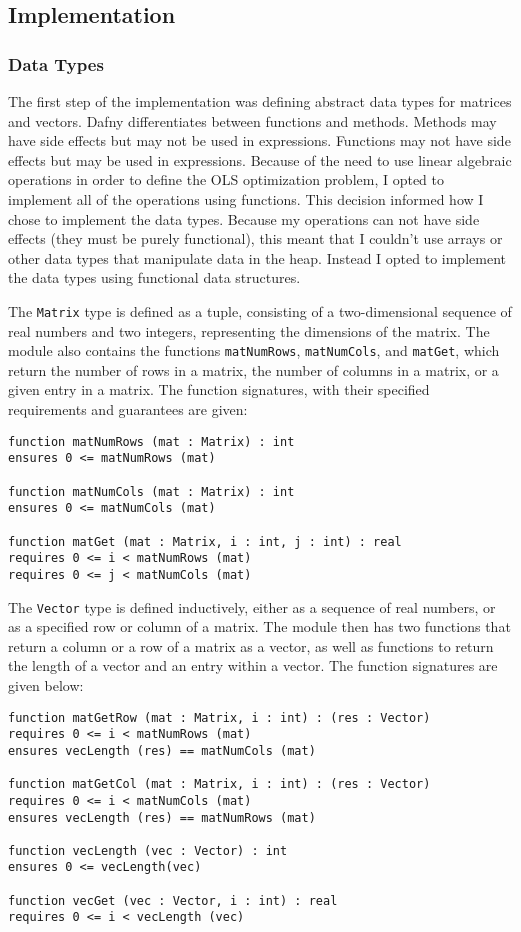 \documentclass[12pt]{article}
\begin{document}
\subsection{Implementation}
\subsubsection{Data Types}
The first step of the implementation was defining abstract data types for matrices and vectors. Dafny differentiates between functions and methods. Methods may have side effects but may not be used in expressions. Functions may not have side effects but may be used in expressions. Because of the need to use linear algebraic operations in order to define the OLS optimization problem, I opted to implement all of the operations using functions. This decision informed how I chose to implement the data types. Because my operations can not have side effects (they must be purely functional), this meant that I couldn't use arrays or other data types that manipulate data in the heap. Instead I opted to implement the data types using functional data structures.

The \verb|Matrix| type is defined as a tuple, consisting of a two-dimensional sequence of real numbers and two integers, representing the dimensions of the matrix. The module also contains the functions \verb|matNumRows|, \verb|matNumCols|, and \verb|matGet|, which return the number of rows in a matrix, the number of columns in a matrix, or a given entry in a matrix. The function signatures, with their specified  requirements and guarantees are given:

\begin{verbatim}
function matNumRows (mat : Matrix) : int
ensures 0 <= matNumRows (mat)

function matNumCols (mat : Matrix) : int
ensures 0 <= matNumCols (mat)

function matGet (mat : Matrix, i : int, j : int) : real
requires 0 <= i < matNumRows (mat)
requires 0 <= j < matNumCols (mat)
\end{verbatim}

The \verb|Vector| type is defined inductively, either as a sequence of real numbers, or as a specified row or column of a matrix. The module then has two functions that return a column or a row of a matrix as a vector, as well as functions to return the length of a vector and an entry within a vector. The function signatures are given below:

\begin{verbatim}
function matGetRow (mat : Matrix, i : int) : (res : Vector)
requires 0 <= i < matNumRows (mat)
ensures vecLength (res) == matNumCols (mat)

function matGetCol (mat : Matrix, i : int) : (res : Vector)
requires 0 <= i < matNumCols (mat)
ensures vecLength (res) == matNumRows (mat)

function vecLength (vec : Vector) : int
ensures 0 <= vecLength(vec)

function vecGet (vec : Vector, i : int) : real
requires 0 <= i < vecLength (vec)
\end{verbatim}
\end{document}
